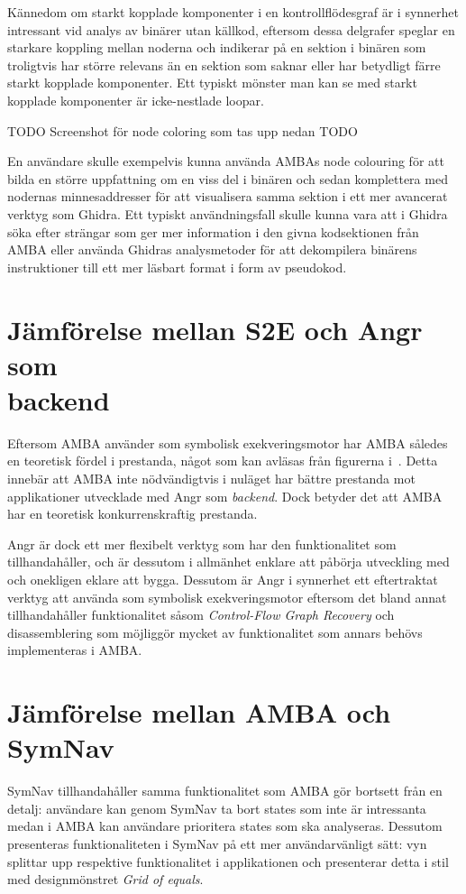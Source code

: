 Kännedom om starkt kopplade komponenter i en kontrollflödesgraf är i synnerhet
intressant vid analys av binärer utan källkod, eftersom dessa delgrafer speglar
en starkare koppling mellan noderna och indikerar på en sektion i binären som
troligtvis har större relevans än en sektion som saknar eller har betydligt
färre starkt kopplade komponenter. Ett typiskt mönster man kan se med starkt
kopplade komponenter är icke-nestlade loopar.

TODO Screenshot för node coloring som tas upp nedan TODO

En användare skulle exempelvis kunna använda AMBAs node colouring för att bilda
en större uppfattning om en viss del i binären och sedan komplettera med
nodernas minnesaddresser för att visualisera samma sektion i ett mer avancerat
verktyg som Ghidra. Ett typiskt användningsfall skulle kunna vara att i Ghidra
söka efter strängar som ger mer information i den givna kodsektionen från AMBA
eller använda Ghidras analysmetoder för att dekompilera binärens instruktioner
till ett mer läsbart format i form av pseudokod.

\section{Jämförelse mellan S2E och Angr som \\ backend} Eftersom AMBA använder
\stoe{} som symbolisk exekveringsmotor har AMBA således en teoretisk fördel i
prestanda, något som kan avläsas från figurerna
i~\cite[Figur~1-5]{systematic_comparison_symbex}. Detta innebär att AMBA inte nödvändigtvis i
nuläget har bättre prestanda mot applikationer utvecklade med Angr som
\emph{backend}. Dock betyder det att AMBA har en teoretisk konkurrenskraftig
prestanda.

Angr är dock ett mer flexibelt verktyg som har den funktionalitet som \stoe{}
tillhandahåller, och är dessutom i allmänhet enklare att påbörja utveckling med
och onekligen eklare att bygga. Dessutom är Angr i synnerhet ett eftertraktat
verktyg att använda som symbolisk exekveringsmotor eftersom det bland annat
tillhandahåller funktionalitet såsom \emph{Control-Flow Graph Recovery} och
disassemblering som möjliggör mycket av funktionalitet som annars behövs
implementeras i AMBA.

\section{Jämförelse mellan AMBA och SymNav} SymNav tillhandahåller samma
funktionalitet som AMBA gör bortsett från en detalj: användare kan genom SymNav
ta bort states som inte är intressanta medan i AMBA kan användare prioritera
states som ska analyseras. Dessutom presenteras funktionaliteten i SymNav på ett
mer användarvänligt sätt: vyn splittar upp respektive funktionalitet i
applikationen och presenterar detta i stil med designmönstret \emph{Grid of
    equals}.

